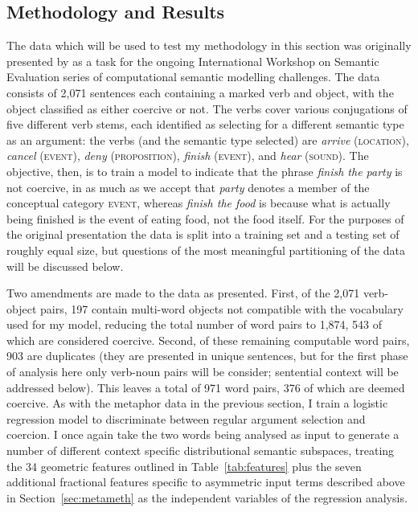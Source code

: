 \subsection{Methodology and Results}
The data which will be used to test my methodology in this section was originally presented by \cite{PustejovskyEA2010} as a task for the ongoing International Workshop on Semantic Evaluation series of computational semantic modelling challenges.  The data consists of 2,071 sentences each containing a marked verb and object, with the object classified as either coercive or not.  The verbs cover various conjugations of five different verb stems, each identified as selecting for a different semantic type as an argument: the verbs (and the semantic type selected) are \emph{arrive} (\textsc{location}), \emph{cancel} (\textsc{event}), \emph{deny} (\textsc{proposition}), \emph{finish} (\textsc{event}), and \emph{hear} (\textsc{sound}).  The objective, then, is to train a model to indicate that the phrase \emph{finish the party} is not coercive, in as much as we accept that \emph{party} denotes a member of the conceptual category \textsc{event}, whereas \emph{finish the food} is because what is actually being finished is the event of eating food, not the food itself.  For the purposes of the original presentation the data is split into a training set and a testing set of roughly equal size, but questions of the most meaningful partitioning of the data will be discussed below.

Two amendments are made to the data as presented.  First, of the 2,071 verb-object pairs, 197 contain multi-word objects not compatible with the vocabulary used for my model, reducing the total number of word pairs to 1,874, 543 of which are considered coercive.  Second, of these remaining computable word pairs, 903 are duplicates (they are presented in unique sentences, but for the first phase of analysis here only verb-noun pairs will be consider; sentential context will be addressed below).  This leaves a total of 971 word pairs, 376 of which are deemed coercive.  As with the metaphor data in the previous section, I train a logistic regression model to discriminate between regular argument selection and coercion.  I once again take the two words being analysed as input to generate a number of different context specific distributional semantic subspaces, treating the 34 geometric features outlined in Table~\ref{tab:features} plus the seven additional fractional features specific to asymmetric input terms described above in Section~\ref{sec:metameth} as the independent variables of the regression analysis.


